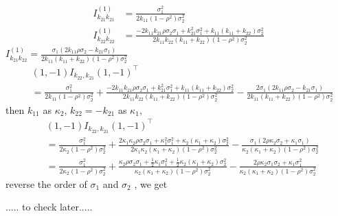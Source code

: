 \documentclass[11pt]{article}%
\theoremstyle{definition}
\begin{document}
\begin{align}
I_{k_{21}k_{21}}^{\left(  1\right)  }  &  =\frac{\sigma_{1}^{2}}%
{2k_{11}\left(  1-\rho^{2}\right)  \sigma_{2}^{2}}\nonumber\\
I_{k_{22}k_{22}}^{\left(  1\right)  }  &  =\frac{-2k_{11}k_{21}\rho\sigma
_{2}\sigma_{1}+k_{21}^{2}\sigma_{1}^{2}+k_{11}\left(  k_{11}+k_{22}\right)
\sigma_{2}^{2}}{2k_{11}k_{22}\left(  k_{11}+k_{22}\right)  \left(  1-\rho
^{2}\right)  \sigma_{2}^{2}}\nonumber
\end{align}
$I_{k_{21}k_{22}}^{\left(  1\right)  }=\frac{\sigma_{1}\left(  2k_{11}%
\rho\sigma_{2}-k_{21}\sigma_{1}\right)  }{2k_{11}\left(  k_{11}+k_{22}\right)
\left(  1-\rho^{2}\right)  \sigma_{2}^{2}}$%
\begin{align*}
&  (1,-1)I_{k_{22},k_{21}}(1,-1)^{\intercal}\\
&  =\frac{\sigma_{1}^{2}}{2k_{11}\left(  1-\rho^{2}\right)  \sigma_{2}^{2}%
}+\frac{-2k_{11}k_{21}\rho\sigma_{2}\sigma_{1}+k_{21}^{2}\sigma_{1}^{2}%
+k_{11}\left(  k_{11}+k_{22}\right)  \sigma_{2}^{2}}{2k_{11}k_{22}\left(
k_{11}+k_{22}\right)  \left(  1-\rho^{2}\right)  \sigma_{2}^{2}}-\frac
{2\sigma_{1}\left(  2k_{11}\rho\sigma_{2}-k_{21}\sigma_{1}\right)  }%
{2k_{11}\left(  k_{11}+k_{22}\right)  \left(  1-\rho^{2}\right)  \sigma
_{2}^{2}}%
\end{align*}
then $k_{11}$ as $\kappa_{2}$, $k_{22}=-k_{21}$ as $\kappa_{1}$,
\begin{align*}
&  (1,-1)I_{k_{22},k_{21}}(1,-1)^{\intercal}\\
&  =\frac{\sigma_{1}^{2}}{2\kappa_{2}\left(  1-\rho^{2}\right)  \sigma_{2}%
^{2}}+\frac{2\kappa_{1}\kappa_{2}\rho\sigma_{2}\sigma_{1}+\kappa_{1}^{2}%
\sigma_{1}^{2}+\kappa_{2}\left(  \kappa_{1}+\kappa_{2}\right)  \sigma_{2}^{2}%
}{2\kappa_{1}\kappa_{2}\left(  \kappa_{1}+\kappa_{2}\right)  \left(
1-\rho^{2}\right)  \sigma_{2}^{2}}-\frac{\sigma_{1}\left(  2\rho\kappa
_{2}\sigma_{2}+\kappa_{1}\sigma_{1}\right)  }{\kappa_{2}\left(  \kappa
_{1}+\kappa_{2}\right)  \left(  1-\rho^{2}\right)  \sigma_{2}^{2}}\\
&  =\frac{\sigma_{1}^{2}}{2\kappa_{2}\left(  1-\rho^{2}\right)  \sigma_{2}%
^{2}}+\frac{\kappa_{2}\rho\sigma_{2}\sigma_{1}+\frac{1}{2}\kappa_{1}\sigma
_{1}^{2}+\frac{1}{2}\kappa_{2}\left(  \kappa_{1}+\kappa_{2}\right)  \sigma
_{2}^{2}}{\kappa_{2}\left(  \kappa_{1}+\kappa_{2}\right)  \left(  1-\rho
^{2}\right)  \sigma_{2}^{2}}-\frac{2\rho\kappa_{2}\sigma_{1}\sigma_{2}%
+\kappa_{1}\sigma_{1}^{2}}{\kappa_{2}\left(  \kappa_{1}+\kappa_{2}\right)
\left(  1-\rho^{2}\right)  \sigma_{2}^{2}}%
\end{align*}
reverse the order of $\sigma_{1}$ and $\sigma_{2}$ , we get

\bigskip

..... to check later.....
\end{document}
